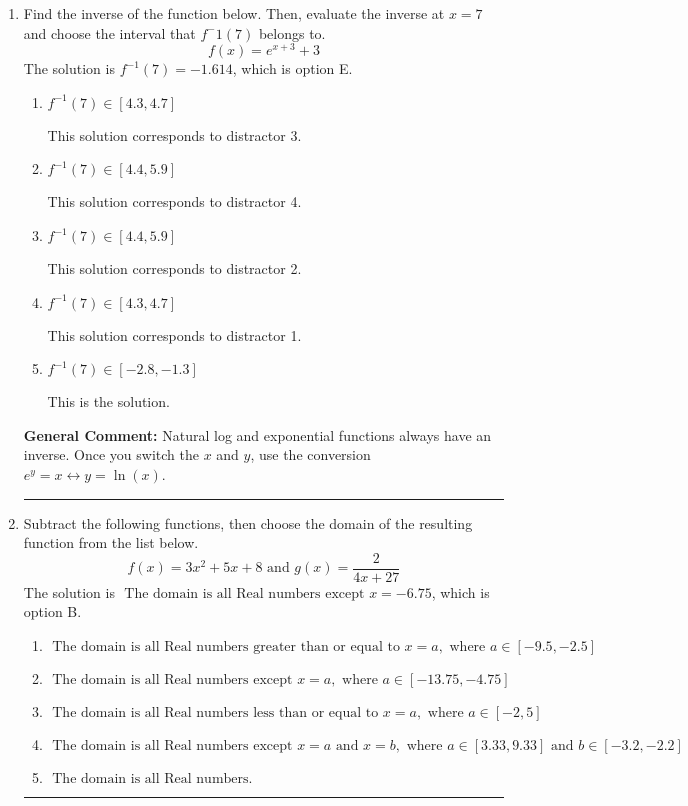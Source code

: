 \documentclass{extbook}[14pt]
\newcommand{\litem}[1]{\item #1

\rule{\textwidth}{0.4pt}}
\begin{document}
\begin{enumerate}\litem{
Find the inverse of the function below. Then, evaluate the inverse at $x = 7$ and choose the interval that $f^-1(7)$ belongs to.
\[ f(x) = e^{x+3}+3 \]The solution is \( f^{-1}(7) = -1.614 \), which is option E.\begin{enumerate}[label=\Alph*.]
\item \( f^{-1}(7) \in [4.3, 4.7] \)

 This solution corresponds to distractor 3.
\item \( f^{-1}(7) \in [4.4, 5.9] \)

 This solution corresponds to distractor 4.
\item \( f^{-1}(7) \in [4.4, 5.9] \)

 This solution corresponds to distractor 2.
\item \( f^{-1}(7) \in [4.3, 4.7] \)

 This solution corresponds to distractor 1.
\item \( f^{-1}(7) \in [-2.8, -1.3] \)

 This is the solution.
\end{enumerate}

\textbf{General Comment:} Natural log and exponential functions always have an inverse. Once you switch the $x$ and $y$, use the conversion $ e^y = x \leftrightarrow y=\ln(x)$.
}
\litem{
Subtract the following functions, then choose the domain of the resulting function from the list below.
\[ f(x) = 3x^{2} +5 x + 8 \text{ and } g(x) = \frac{2}{4x+27} \]The solution is \( \text{ The domain is all Real numbers except } x = -6.75 \), which is option B.\begin{enumerate}[label=\Alph*.]
\item \( \text{ The domain is all Real numbers greater than or equal to } x = a, \text{ where } a \in [-9.5, -2.5] \)


\item \( \text{ The domain is all Real numbers except } x = a, \text{ where } a \in [-13.75, -4.75] \)


\item \( \text{ The domain is all Real numbers less than or equal to } x = a, \text{ where } a \in [-2, 5] \)


\item \( \text{ The domain is all Real numbers except } x = a \text{ and } x = b, \text{ where } a \in [3.33, 9.33] \text{ and } b \in [-3.2, -2.2] \)


\item \( \text{ The domain is all Real numbers. } \)



\end{enumerate}}
\end{enumerate}
\end{document}
